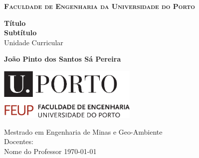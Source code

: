 \begin{titlepage}
\setlength{\headheight}{14pt}
    \begin{center}
        \large 
        \Large\textbf{{\scshape Faculdade de Engenharia da Universidade do Porto}}
        \vspace*{1.8cm}

        \huge
        \textbf{Título}\\
        \textbf{Subtítulo} \\
        \vspace{0.5cm}
        \LARGE
        Unidade Curricular

        \vspace{1cm}
        \Large
        \textbf{João Pinto dos Santos Sá Pereira}

        \vspace{3cm}

        \includegraphics[width=0.5\textwidth]{imagens/uporto-feup.pdf}
        \vspace{2cm}
        
        \large
        Mestrado em Engenharia de Minas e Geo-Ambiente\\
        \vspace{0.5cm}
        Docentes:\\
        Nome do Professor
        \vfill
        \today
       
    \end{center}
\end{titlepage}
